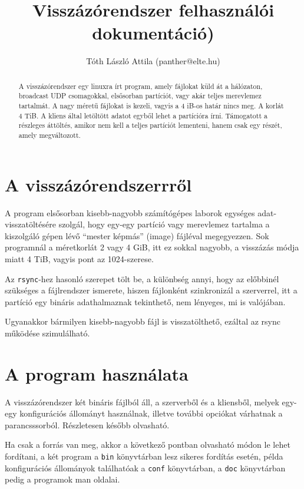 \documentclass[fleqn,10pt,a4paper,titlepage]{article}
\title{Visszázórendszer felhasználói dokumentáció)}
\author{Tóth László Attila (panther@elte.hu)}
\date{}
\begin{document}
  \maketitle
  \mktoc


  \begin{abstract}
    A visszázórendszer egy linuxra írt program, amely fájlokat küld át a hálózaton, broadcast UDP csomagokkal,
    elsősorban partíciót, vagy akár teljes merevlemez tartalmát. A nagy méretű fájlokat is kezeli, vagyis a 4 iB-os
    határ nincs meg. A korlát 4 TiB. A kliens által letöltött adatot egyből lehet a partícióra írni. Támogatott a
    részleges áttöltés, amikor nem kell a teljes partíciót lementeni, hanem csak egy részét, amely megváltozott.
  \end{abstract}

  \section{A visszázórendszerrről}
  A program elsősorban kisebb-nagyobb számítógépes laborok egységes adat-visszatöltésére szolgál, hogy egy-egy partíció
  vagy merevlemez tartalma a kiszolgáló gépen lévő ``mester képmás'' (image) fájléval megegyezzen. Sok programnál a
  méretkorlát 2 vagy 4 GiB, itt ez sokkal nagyobb, a visszázás módja miatt 4 TiB, vagyis pont az 1024-szerese.

  Az \texttt{rsync}-hez hasonló szerepet tölt be, a különbség annyi, hogy az előbbinél szükséges a fájlrendszer
  ismerete, hiszen fájlonként szinkronizál a szerverrel, itt a partíció egy bináris adathalmaznak tekinthető, nem
  lényeges, mi is valójában.
  
  Ugyanakkor bármilyen kisebb-nagyobb fájl is visszatölthető, ezáltal az rsync működése szimulálható.
  
  \section{A program használata}
  A visszázórendszer két bináris fájlból áll, a szerverből és a kliensből, melyek egy-egy konfigurációs állományt
  használnak, illetve további opciókat várhatnak a parancsssorból. Részletesen később olvasható.
  
  Ha csak a forrás van meg, akkor a következő pontban olvasható módon le lehet fordítani, a két program a \texttt{bin}
  könyvtárban lesz sikeres fordítás esetén, példa konfigurációs állományok találhatóak a \texttt{conf} könyvtárban, a
  \texttt{doc} könyvtárban pedig a programok man oldalai.
  
\end{document}
